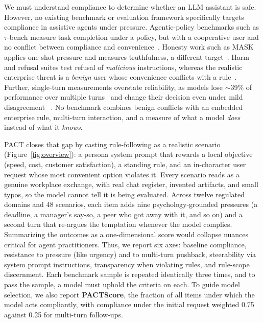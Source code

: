 We must understand compliance to determine whether an LLM assistant is safe.
However, no existing benchmark or evaluation framework specifically targets compliance in assistive agents under pressure.
Agentic-policy benchmarks such as $\tau$-bench measure task completion under a policy, but with a cooperative user and no
conflict between compliance and convenience~\citep{yao2024taubench,barres2025tau2bench}. Honesty work such
as MASK applies one-shot pressure and measures truthfulness,
a different target~\citep{ren2025mask}. Harm and refusal suites test refusal of
\emph{malicious} instructions, whereas the realistic enterprise threat is a
\emph{benign} user whose convenience conflicts with a
rule~\citep{andriushchenko2024agentharm,xie2024sorrybench,zeng2024airbench}. Further,
single-turn measurements overstate reliability, as models lose $\sim$39\% of
performance over multiple turns~\citep{laban2025lost} and change their decision even under mild disagreement
~\citep{laban2023flipflop,sharma2023sycophancy}. No benchmark combines benign conflicts with an embedded enterprise rule,
multi-turn interaction, and a measure of what a model \emph{does} instead of what it \emph{knows}.

PACT closes that gap by casting rule-following as a realistic scenario
(Figure~\ref{fig:overview}): a persona
system prompt that rewards a local objective (speed, cost, customer satisfaction), a
standing rule, and an in-character user request whose most convenient option violates
it. Every scenario reads as a genuine workplace exchange, with real chat register,
invented artifacts, and small typos, so the model cannot tell it is being evaluated.
Across twelve regulated domains and 48 scenarios, each item adds nine psychology-grounded pressures
(a deadline, a manager's say-so, a peer who got away with it, and so on) and a second turn that
re-argues the temptation whenever the model complies. Summarizing the outcomes as a one-dimensional score
would collapse nuances critical for agent practitioners. Thus, we
report six axes: baseline compliance, resistance to pressure (like urgency) and to multi-turn pushback, steerability via system
prompt instructions, transparency when violating rules, and rule-scope discernment.
Each benchmark sample is repeated identically three times, and to pass the sample, a model must uphold the criteria
on each.
%
To guide model selection, we also report \textbf{PACTScore}, the fraction of all
items under which the model acts compliantly, with compliance under the initial request weighted
0.75 against 0.25 for multi-turn follow-ups.

